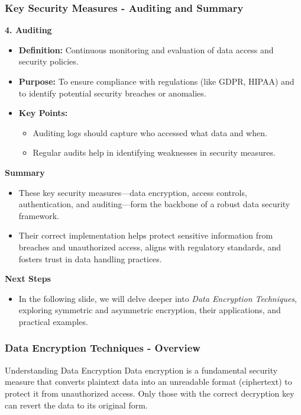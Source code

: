 \documentclass{beamer}
\begin{document}
\begin{frame}[fragile]
    \frametitle{Key Security Measures - Auditing and Summary}
    \textbf{4. Auditing}
    \begin{itemize}
        \item \textbf{Definition:} Continuous monitoring and evaluation of data access and security policies.
        \item \textbf{Purpose:} To ensure compliance with regulations (like GDPR, HIPAA) and to identify potential security breaches or anomalies.
        \item \textbf{Key Points:}
            \begin{itemize}
                \item Auditing logs should capture who accessed what data and when.
                \item Regular audits help in identifying weaknesses in security measures.
            \end{itemize}
    \end{itemize}
    
    \vspace{1em}
    \textbf{Summary}
    \begin{itemize}
        \item These key security measures—data encryption, access controls, authentication, and auditing—form the backbone of a robust data security framework.
        \item Their correct implementation helps protect sensitive information from breaches and unauthorized access, aligns with regulatory standards, and fosters trust in data handling practices.
    \end{itemize}
    
    \vspace{1em}
    \textbf{Next Steps}
    \begin{itemize}
        \item In the following slide, we will delve deeper into \textit{Data Encryption Techniques}, exploring symmetric and asymmetric encryption, their applications, and practical examples.
    \end{itemize}
\end{frame}

\begin{frame}[fragile]
    \frametitle{Data Encryption Techniques - Overview}
    \begin{block}{Understanding Data Encryption}
        Data encryption is a fundamental security measure that converts plaintext data into an unreadable format (ciphertext) to protect it from unauthorized access. Only those with the correct decryption key can revert the data to its original form.
    \end{block}
\end{frame}
\end{document}
